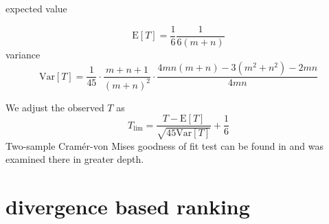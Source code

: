expected value

\begin{equation}
\mathrm{E} [T] = \frac{1}{6} \frac{1}{6(m+n)}
\end{equation}
variance 
\begin{equation}
\mathrm{Var} [T] = \frac{1}{45} \cdot \frac{m+n+1}{(m+n)^2} \cdot \frac{4mn(m+n) - 3(m^2 + n^2)-2mn}{4mn}
\end{equation}

We adjust the observed $T$ as
\begin{equation}
T_\mathrm{lim} = \frac{T-\mathrm{E}[T]}{\sqrt{45\mathrm{Var}[T]}} + \frac{1}{6}
\end{equation}
Two-sample Cram\'er-von Mises goodness of fit test can be found in \cite{Anderson62} and was examined there in greater depth.

\section{\ren divergence based ranking}



